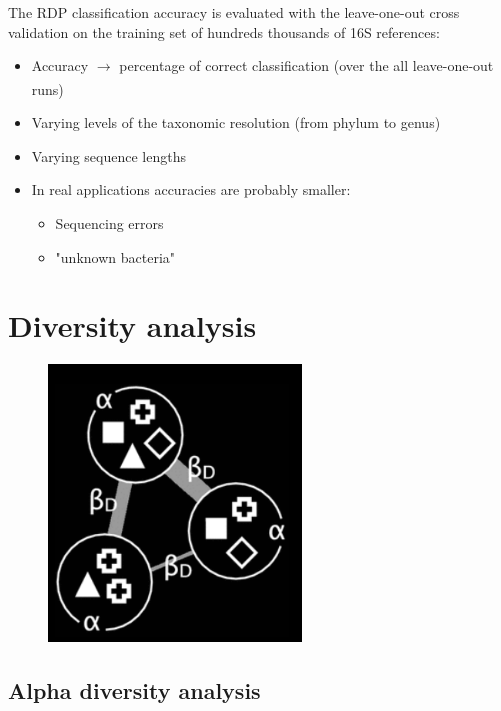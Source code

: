 The RDP classification accuracy is evaluated with the leave-one-out cross validation on the training set of hundreds thousands of 16S references: 

\begin{itemize}
    \item Accuracy $\xrightarrow[]{}$ percentage of correct classification (over the all leave-one-out runs)
    \item Varying levels of the taxonomic resolution (from phylum to genus)
    \item Varying sequence lengths
    \item In real applications accuracies are probably smaller:
    \begin{itemize}
        \item Sequencing errors
        \item "unknown bacteria"
    \end{itemize}

\end{itemize}

\section{Diversity analysis}

\begin{figure}[h]
\centering
\includegraphics[width=0.6\textwidth]{Diversity.png}
\caption{}
\end{figure}

\subsection{Alpha diversity analysis}

